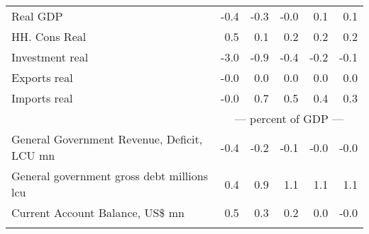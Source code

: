 \documentclass{article}
\begin{document}
\begin{table}[ht]
\begin{tabular}{lrrrrr}
Real GDP & -0.4 & -0.3 & -0.0 & 0.1 & 0.1 \\
HH. Cons Real & 0.5 & 0.1 & 0.2 & 0.2 & 0.2 \\
Investment real & -3.0 & -0.9 & -0.4 & -0.2 & -0.1 \\
Exports real & -0.0 & 0.0 & 0.0 & 0.0 & 0.0 \\
Imports real & -0.0 & 0.7 & 0.5 & 0.4 & 0.3 \\
&\multicolumn{5}{c}{--- percent of GDP ---}           \\
General Government Revenue, Deficit, LCU mn & -0.4 & -0.2 & -0.1 & -0.0 & -0.0 \\
General government gross debt millions lcu & 0.4 & 0.9 & 1.1 & 1.1 & 1.1 \\
Current Account Balance, US\$ mn & 0.5 & 0.3 & 0.2 & 0.0 & -0.0 \\
&\multicolumn{5}{c}{ }           \\
\bottomrule
\end{tabular}
\end{table}
\end{document}
